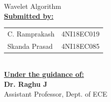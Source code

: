 \documentclass[a4paper,12pt]{report}
\begin{document}
\begin{titlepage}
\begin{center}
{        Wavelet Algorithm} \\
        \vspace{1cm}
        \textbf{\underline{\large Submitted by:}} \\
        \vspace{0.5cm}
        \begin{tabular}[H]{l l}
            C. Ramprakash & 4NI18EC019 \\
            Skanda Prasad & 4NI18EC085 \\
        \end{tabular}
        \\
        \vspace{1cm}
        \textbf{\underline{\large Under the guidance of:}} \\
        \vspace{0.5cm}
        \textbf{\large Dr. Raghu J} \\
        Assistant Professor, Dept. of ECE \\
    \end{center}
\end{titlepage}
\clearpage
\restoregeometry

\tableofcontents
\newpage

\listoffigures
\listoftables
\listoflistings
\newpage






\printbibliography
\end{document}
